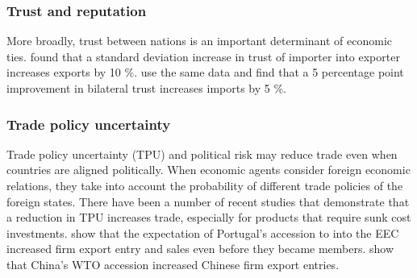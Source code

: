 \subsubsection*{Trust and reputation}

More broadly, trust between nations is an important determinant of economic ties. \cite{Guiso2009} found that a standard deviation increase in trust of importer into exporter increases exports by 10 \%. \cite{Disdier2007} use the same data and find that a 5 percentage point improvement in bilateral trust increases imports by 5 \%. 

\subsubsection*{Trade policy uncertainty}

Trade policy uncertainty (TPU) and political risk may reduce trade even when countries are aligned politically. When economic agents consider foreign economic relations, they take into account the probability of different trade policies of the foreign states. There have been a number of recent studies that demonstrate that a reduction in TPU increases trade, especially for products that require sunk cost investments. \cite{Handley2015} show that the expectation of Portugal's accession to into the EEC increased firm export entry and sales even before they became members. \cite{Feng2017} show that China's WTO accession  increased Chinese firm export entries.


